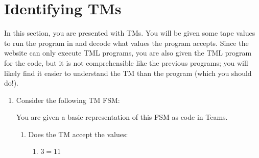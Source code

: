 \documentclass[answers]{exam}
\begin{document}
    \section{Identifying TMs}
    In this section, you are presented with TMs. You will be given some tape values to run the program in and decode what values the program accepts. Since the website can only execute TML programs, you are also given the TML program for the code, but it is not comprehensible like the previous programs; you will likely find it easier to understand the TM than the program (which you should do!). 
    \begin{enumerate}
        \item Consider the following TM FSM:
        \begin{figure}[H]
            \centering
        \end{figure}
        You are given a basic representation of this FSM as code in Teams.
        \begin{enumerate}
            \item Does the TM accept the values:
            \begin{enumerate}
                \item $3 = 11$
                \begin{solution}
                    
                \end{solution}


\end{enumerate}
\end{enumerate}
\end{enumerate}
\end{document}

